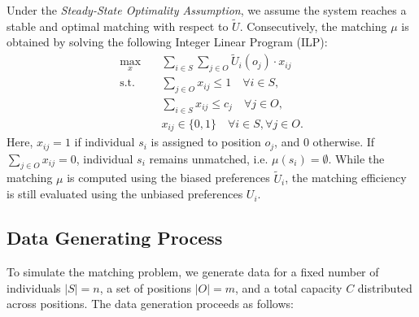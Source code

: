 \documentclass[letterpaper]{article}
\begin{document}
Under the \textit{Steady-State Optimality Assumption}, we assume the system reaches a stable and optimal matching with respect to \( \tilde{U} \). Consecutively, the matching \( \mu \) is obtained by solving the following Integer Linear Program (ILP):
\begin{align*}
\max_{x} \quad & \sum_{i \in S} \sum_{j \in O} \tilde{U}_i(o_j) \cdot x_{ij} \\
\text{s.t.} \quad & \sum_{j \in O} x_{ij} \leq 1 \quad \forall i \in S, \\
& \sum_{i \in S} x_{ij} \leq c_j \quad \forall j \in O, \\
& x_{ij} \in \{0, 1\} \quad \forall i \in S, \forall j \in O.
\end{align*}
Here, \( x_{ij} = 1 \) if individual \( s_i \) is assigned to position \( o_j \), and \( 0 \) otherwise. If \( \sum_{j \in O} x_{ij} = 0 \), individual \( s_i \) remains unmatched, i.e. \(\mu(s_i) = \emptyset\). While the matching \( \mu \) is computed using the biased preferences \( \tilde{U}_i \), the matching efficiency is still evaluated using the unbiased preferences \( U_i \).

\subsection*{Data Generating Process}

To simulate the matching problem, we generate data for a fixed number of individuals \( |S| = n \), a set of positions \( |O| = m \), and a total capacity \( C \) distributed across positions. The data generation proceeds as follows:
\end{document}
